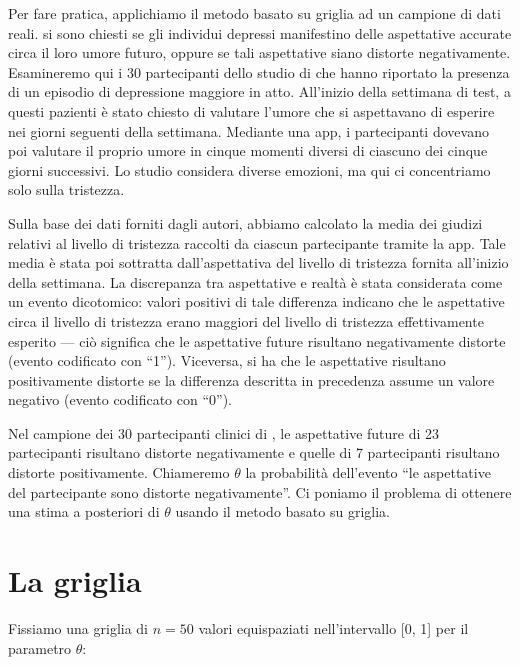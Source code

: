 \documentclass[
  11pt,
]{krantz}
\theoremstyle{definition}
\theoremstyle{definition}
\theoremstyle{definition}
\theoremstyle{definition}
\theoremstyle{remark}
\begin{document}
Per fare pratica, applichiamo il metodo basato su griglia ad un campione di dati reali. \citet{zetschefuture2019} si sono chiesti se gli individui depressi manifestino delle aspettative accurate circa il loro umore futuro, oppure se tali aspettative siano distorte negativamente. Esamineremo qui i 30 partecipanti dello studio di \citet{zetschefuture2019} che hanno riportato la presenza di un episodio di depressione maggiore in atto. All'inizio della settimana di test, a questi pazienti è stato chiesto di valutare l'umore che si aspettavano di esperire nei giorni seguenti della settimana. Mediante una app, i partecipanti dovevano poi valutare il proprio umore in cinque momenti diversi di ciascuno dei cinque giorni successivi. Lo studio considera diverse emozioni, ma qui ci concentriamo solo sulla tristezza.

Sulla base dei dati forniti dagli autori, abbiamo calcolato la media dei giudizi relativi al livello di tristezza raccolti da ciascun partecipante tramite la app. Tale media è stata poi sottratta dall'aspettativa del livello di tristezza fornita all'inizio della settimana. La discrepanza tra aspettative e realtà è stata considerata come un evento dicotomico: valori positivi di tale differenza indicano che le aspettative circa il livello di tristezza erano maggiori del livello di tristezza effettivamente esperito --- ciò significa che le aspettative future risultano negativamente distorte (evento codificato con ``1''). Viceversa, si ha che le aspettative risultano positivamente distorte se la differenza descritta in precedenza assume un valore negativo (evento codificato con ``0'').

Nel campione dei 30 partecipanti clinici di \citet{zetschefuture2019}, le aspettative future di 23 partecipanti risultano distorte negativamente e quelle di 7 partecipanti risultano distorte positivamente. Chiameremo \(\theta\) la probabilità dell'evento ``le aspettative del partecipante sono distorte negativamente''. Ci poniamo il problema di ottenere una stima a posteriori di \(\theta\) usando il metodo basato su griglia.

\hypertarget{la-griglia}{%
\section{La griglia}\label{la-griglia}}

Fissiamo una griglia di \(n = 50\) valori equispaziati nell'intervallo {[}0, 1{]} per il parametro \(\theta\):
\end{document}
